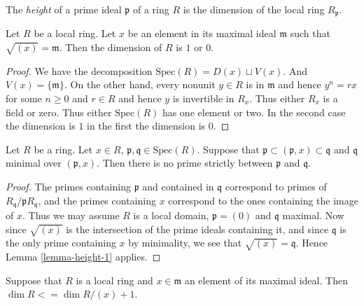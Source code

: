 \begin{definition}
\label{definition-height}
The {\it height} of a prime ideal $\mathfrak p$ of
a ring $R$ is the dimension of the local ring $R_{\mathfrak p}$.
\end{definition}

\begin{lemma}
\label{lemma-height-1}
Let $R$ be a local ring. Let $x$ be an element 
in its maximal ideal $\mathfrak m$ such that
$\sqrt{(x)} = \mathfrak m$. Then the dimension
of $R$ is $1$ or $0$.
\end{lemma}

\begin{proof}
We have the decomposition $\text{Spec}(R)
= D(x) \sqcup V(x)$. And $V(x) = \{\mathfrak m\}$.
On the other hand, every nonunit $y \in R$ is in
$\mathfrak m$ and hence $y^n = rx$ for some $n \geq 0$ and
$r \in R$ and hence $y$ is invertible in $R_x$. Thus either
$R_x$ is a field or zero. Thus either $\text{Spec}(R)$
has one element or two. In the second case the dimension
is $1$ in the first the dimension is $0$.
\end{proof}

\begin{lemma}
\label{lemma-minimal-over-1}
Let $R$ be a ring. Let $x\in R$, $\mathfrak p, \mathfrak q\in \text{Spec}(R)$.
Suppose that $\mathfrak p \subset (\mathfrak p, x) \subset
\mathfrak q$ and $\mathfrak q$ minimal over $(\mathfrak p, x)$.
Then there is no prime strictly between $\mathfrak p$ and $\mathfrak q$.
\end{lemma}

\begin{proof}
The primes containing $\mathfrak p$ and contained
in $\mathfrak q$ correspond to primes of
$R_{\mathfrak q}/\mathfrak pR_{\mathfrak q}$, and
the primes containing $x$ correspond to the ones containing
the image of $x$. Thus we may assume $R$ is a local domain,
$\mathfrak p = (0)$ and $\mathfrak q$ maximal. Now since
$\sqrt{(x)}$ is the intersection of the prime ideals
containing it, and since $\mathfrak q$ is the only prime
containing $x$ by minimality, we see that $\sqrt{(x)} = \mathfrak q$.
Hence Lemma \ref{lemma-height-1} applies.
\end{proof}


\begin{lemma}
\label{lemma-one-equation}
Suppose that $R$ is a local ring and $x\in \mathfrak m$ an
element of its maximal ideal. Then $\dim R <= \dim R/(x) + 1$.
\end{lemma}

